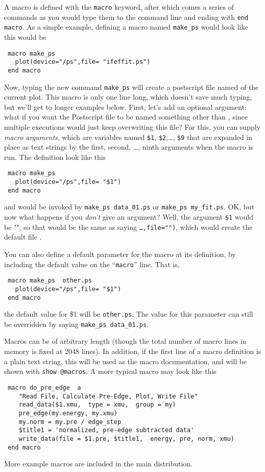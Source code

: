 \documentclass[11pt]{article}
\begin{document}
A macro is defined with the {\tt{macro}} keyword, after which comes a
series of commands as you would type them to 
the command line and ending with {\tt{end macro}}.  As a simple example, 
defining a macro named {\tt{make\_ps}} would look like this
would be
{\small\begin{verbatim}
 macro make_ps
   plot(device="/ps",file= "ifeffit.ps")
 end macro
\end{verbatim}
}\noindent
Now, typing the new command {\tt{make\_ps}} will create a postscript file
named {} of the current plot.  This macro is only one line
long, which doesn't save much typing, but we'll get to longer examples
below.  First, let's add an optional argument: what if you want the
Postscript file to be named something other than {}, since
multiple executions would just keep overwriting this file?  For this, you
can supply {\emph{macro arguments}}, which are variables named {\tt{\$1}},
{\tt{\$2}},\ldots, {\tt{\$9}} that are expanded in place as text strings by
the first, second, \ldots, ninth arguments when the macro is run.  The
definition look like this
{\small\begin{verbatim}
 macro make_ps
   plot(device="/ps",file= "$1")
 end macro
\end{verbatim}}\noindent  %
and would be invoked by {\tt{make\_ps data\_01.ps}} or {\tt{make\_ps
    my\_fit.ps}}.  OK, but now what happens if you {\emph{don't}} give
an argument?  Well, the argument {\tt{\$1}} would be "", so that would
be the same as saying {\tt{\ldots,file="")}}, which would create the
    default file {}.

You can also define a default parameter for the macro at its
definition, by including the default value on the ``{\tt{macro}}'' line.  
That is, 
{\small\begin{verbatim}
 macro make_ps  other.ps
   plot(device="/ps",file= "$1")
 end macro
\end{verbatim}
}\noindent  %
the default value for {\$1} will be {\tt{other.ps}}.  The value for this
parameter can still be overridden by saying {\tt{make\_ps data\_01.ps}}.

Macros can be of arbitrary length (though the total number of macro lines
in memory is fixed at 2048 lines).  In addition, if the first line of a
macro definition is a plain text string, this will be used as the macro
documentation, and will be shown with {\tt{show @macros}}. A more 
typical macro may look like this
{\small\begin{verbatim}
 macro do_pre_edge  a
    "Read File, Calculate Pre-Edge, Plot, Write File"
    read_data($1.xmu,  type = xmu,  group = my)
    pre_edge(my.energy, my.xmu)
    my.norm = my.pre / edge_step
    $title1 = 'normalized, pre-edge subtracted data'
    write_data(file = $1.pre, $title1,  energy, pre, norm, xmu)
 end macro
\end{verbatim}}\noindent
More example macros are included in the main {\ifeffit} distribution.
\end{document}
